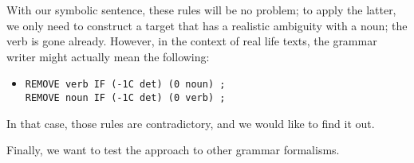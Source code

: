 With our symbolic sentence, these rules will be no problem; to apply the latter, we only need to construct a target that has a realistic ambiguity with a noun; the verb is gone already.
However, in the context of real life texts, the grammar writer might actually mean the following:

\begin{itemize}
\item[] \begin{verbatim}
REMOVE verb IF (-1C det) (0 noun) ;
REMOVE noun IF (-1C det) (0 verb) ;
\end{verbatim}
\end{itemize}

In that case, those rules are contradictory, and we would like to find it out.

Finally, we want to test the approach to other grammar formalisms.




